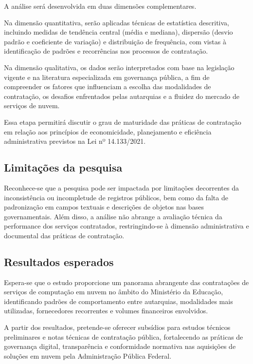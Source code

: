 \documentclass[a4paper, 12pt,brazil]{article}
\begin{document}
A análise será desenvolvida em duas dimensões complementares.

Na dimensão quantitativa, serão aplicadas técnicas de estatística descritiva, incluindo medidas de tendência central (média e mediana), dispersão (desvio padrão e coeficiente de variação) e distribuição de frequência, com vistas à identificação de padrões e recorrências nos processos de contratação.

Na dimensão qualitativa, os dados serão interpretados com base na legislação vigente e na literatura especializada em governança pública, a fim de compreender os fatores que influenciam a escolha das modalidades de contratação, os desafios enfrentados pelas autarquias e a fluidez do mercado de serviços de nuvem.

Essa etapa permitirá discutir o grau de maturidade das práticas de contratação em relação aos princípios de economicidade, planejamento e eficiência administrativa previstos na Lei nº 14.133/2021.

\subsection{Limitações da pesquisa}

Reconhece-se que a pesquisa pode ser impactada por limitações decorrentes da inconsistência ou incompletude de registros públicos, bem como da falta de padronização em campos textuais e descrições de objetos nas bases governamentais. Além disso, a análise não abrange a avaliação técnica da performance dos serviços contratados, restringindo-se à dimensão administrativa e documental das práticas de contratação.

\subsection{Resultados esperados}

Espera-se que o estudo proporcione um panorama abrangente das contratações de serviços de computação em nuvem no âmbito do Ministério da Educação, identificando padrões de comportamento entre autarquias, modalidades mais utilizadas, fornecedores recorrentes e volumes financeiros envolvidos.

A partir dos resultados, pretende-se oferecer subsídios para estudos técnicos preliminares e notas técnicas de contratação pública, fortalecendo as práticas de governança digital, transparência e conformidade normativa nas aquisições de soluções em nuvem pela Administração Pública Federal.
\end{document}
